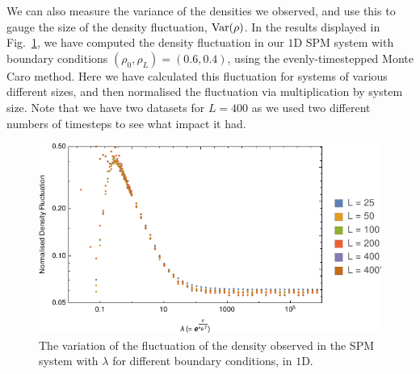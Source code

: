 We can also measure the variance of the densities we observed, and use this to gauge the size of the
density fluctuation, $\mathrm{Var}(\rho)$. In the results displayed in Fig.~\ref{fig:lambdaScanDensityFluc}, we have
computed the density fluctuation in our $1$D SPM system with boundary conditions
$(\rho_0, \rho_L) = (0.6, 0.4)$, using the evenly-timestepped Monte Caro method. Here we have
calculated this fluctuation for systems of various different sizes, and then normalised the fluctuation
via multiplication by system size. Note that we have two datasets for $L=400$ as we used two different
numbers of timesteps to see what impact it had.
\begin{figure} \caption[The variation of the fluctuation of the  density of the SPM system with 
$\lambda$ for different boundary conditions, in $1$D.]{The variation of the fluctuation of the density
observed in the SPM system with $\lambda$ for different boundary conditions, in $1$D.} 
\label{fig:lambdaScanDensityFluc}
\begin{center}
\includegraphics[width=0.95\textheight, angle=270]{numerics/images/lambdaScan/normDenFluc}
\end{center}
\end{figure}

